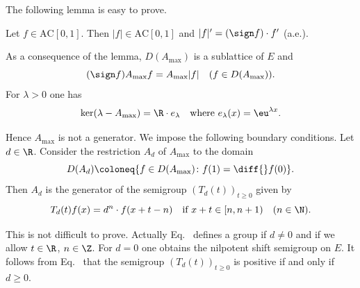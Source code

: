 The following lemma is easy to prove.
\begin{lemma}\label{lem:c2-3.14}
Let $f \in \text{AC}[0,1]$. 
Then $|f| \in \text{AC}[0,1]$ and $|f|' = (\sign  f) \cdot f'$ (a.e.).
\end{lemma}
As a consequence of the lemma, $D(A_{\max})$ is a sublattice of\/ $E$ and
\begin{equation}\label{eq:c2-3.7}
(\sign  f)A_{\max}f = A_{\max}|f| \quad (f \in D(A_{\max})).
\end{equation}
For $\lambda > 0$ one has
\begin{equation}\label{eq:c2-3.8}
\text{ker}(\lambda - A_{\max}) = \R \cdot e_{\lambda} \quad \text{where }  e_{\lambda}(x) = \eu^{\lambda x}.
\end{equation}

Hence $A_{\max}$ is not a generator. 
We impose the following boundary conditions.
Let $d \in \R$. 
Consider the restriction $A_{d}$ of\/ $A_{\max}$ to the domain
\begin{equation*}
D(A_{d}) \coloneq \{f \in D(A_{\max}) \colon f(1) = \diff{}f(0)\}.
\end{equation*}
Then $A_{d}$ is the generator of the semigroup $(T_{d}(t))_{t \geq 0}$ given by
\begin{equation}\label{eq:c2-3.9}
T_{d}(t)f(x) = d^{n} \cdot f(x+t-n) \quad \text{if } x+t \in [n, n+1) \quad (n \in \N ).
\end{equation}

This is not difficult to prove. 
Actually Eq.~ defines a group if\/ $d \neq 0$ and if we allow $t \in \R$, $n \in \Z $. For $d = 0$ one obtains the nilpotent shift semigroup on $E$.
It follows from Eq.~ that the semigroup $(T_{d}(t))_{t \geq 0}$ is positive if and only if\/ $d \geq 0$.

